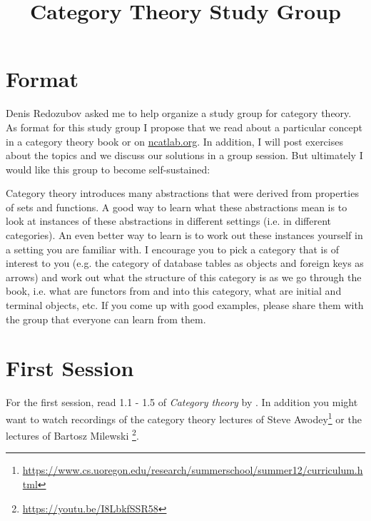 \documentclass{scrartcl}
\title{Category Theory Study Group}
\date{}
\begin{document}
\maketitle

\section*{Format}
Denis Redozubov asked me to help organize a study group for category theory.
As format for this study group I propose that we read about a particular concept in a category theory book or on \url{ncatlab.org}.
In addition, I will post exercises about the topics and we discuss our solutions in a group session. But ultimately I would like this group to become self-sustained:

Category theory introduces many abstractions that were derived from properties of sets and functions.
A good way to learn what these abstractions mean is to look at instances of these abstractions in different settings (i.e. in different categories).
An even better way to learn is to work out these instances yourself in a setting you are familiar with.
I encourage you to pick a category that is of interest to you (e.g. the category of database tables as objects and foreign keys as arrows) and work out what the structure of this category is as we go through the book, i.e. what are functors from and into this category, what are initial and terminal objects, etc.
If you come up with good examples, please share them with the group that everyone can learn from them.

\section*{First Session}
For the first session, read 1.1 - 1.5 of \emph{Category theory} by \cite{awodey2010category}. In addition you might want to watch recordings of the category theory lectures of Steve Awodey\footnote{\url{https://www.cs.uoregon.edu/research/summerschool/summer12/curriculum.html}} or the lectures of Bartosz Milewski \footnote{\url{https://youtu.be/I8LbkfSSR58}}.
\end{document}
